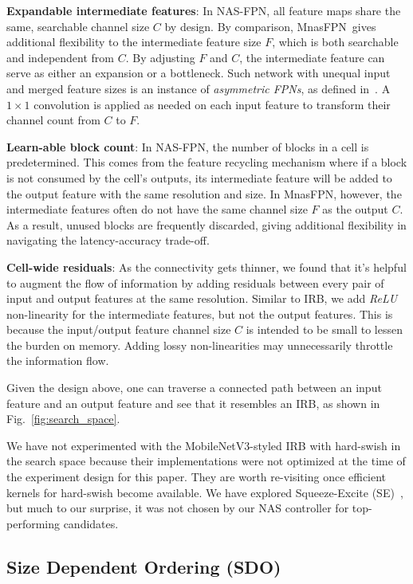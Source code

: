 \documentclass[10pt,twocolumn,letterpaper]{article}
\def\Mnasfpn{MnasFPN~}
\def\Mnasfpnnospace{MnasFPN}
\begin{document}
{\bf Expandable intermediate features}: In NAS-FPN, all feature maps share the same, searchable channel size $C$ by design. By comparison, \Mnasfpn gives additional flexibility to the intermediate feature size $F$, which is both searchable and independent from $C$. By adjusting $F$ and $C$, the intermediate feature can serve as either an expansion or a bottleneck. Such network with unequal input and merged feature sizes is an instance of {\it asymmetric FPNs}, as defined in~\cite{kirillov2019panoptic}. A $1\times1$ convolution is applied as needed on each input feature to transform their channel count from $C$ to $F$. 

{\bf Learn-able block count}: In NAS-FPN, the number of blocks in a cell is predetermined. This comes from the feature recycling mechanism where if a block is not consumed by the cell's outputs, its intermediate feature will be added to the output feature with the same resolution and size. In \Mnasfpnnospace, however, the intermediate features often do not have the same channel size $F$ as the output $C$. As a result, unused blocks are frequently discarded, giving additional flexibility in navigating the latency-accuracy trade-off.  

{\bf Cell-wide residuals}: As the connectivity gets thinner, we found that it's helpful to augment the flow of information by adding residuals between every pair of input and output features at the same resolution. Similar to IRB, we add {\it ReLU} non-linearity for the intermediate features, but not the output features. This is because the input/output feature channel size $C$ is intended to be small to lessen the burden on memory. Adding lossy non-linearities may unnecessarily throttle the information flow. 

Given the design above, one can traverse a connected path between an input feature and an output feature and see that it resembles an IRB, as shown in Fig.~\ref{fig:search_space}. 

We have not experimented with the MobileNetV3-styled IRB with hard-swish in the search space because their implementations were not optimized at the time of the experiment design for this paper. They are worth re-visiting once efficient kernels for hard-swish become available. We have explored Squeeze-Excite (SE)~\cite{hu2018squeeze}, but much to our surprise, it was not chosen by our NAS controller for top-performing candidates.

\subsection{Size Dependent Ordering (SDO)}
\label{sec:sdo}
\end{document}
